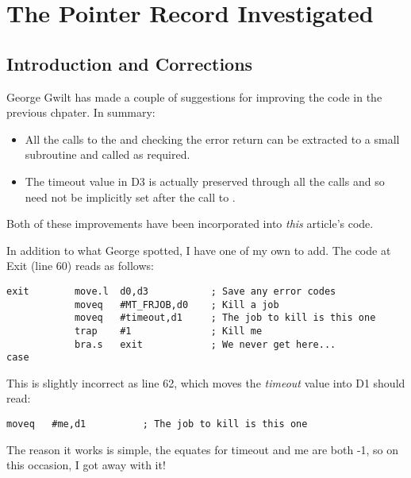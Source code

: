 \chapter{The Pointer Record Investigated}

\section{Introduction and Corrections}
\label{ch21-intro}%

George Gwilt has made a couple of suggestions for improving the code in the previous chpater. In summary:

\begin{itemize}[itemsep=0pt]

\item{}All the calls to the  and checking the error return can be extracted to a small subroutine and called as required.

\item{}The timeout value in D3 is actually preserved through all the  calls and so need not be implicitly set after the call to .

\end{itemize}

Both of these improvements have been incorporated into \emph{this} article's code. 

In addition to what George spotted, I have one of my own to add. The code at Exit (line 60) reads as follows:

\begin{lstlisting}[firstnumber=60,caption={Simple PE Program - Part 10 Original}]
exit        move.l  d0,d3           ; Save any error codes
            moveq   #MT_FRJOB,d0    ; Kill a job
            moveq   #timeout,d1     ; The job to kill is this one
            trap    #1              ; Kill me
            bra.s   exit            ; We never get here...
case
\end{lstlisting}

This is slightly incorrect as line 62, which moves the \emph{timeout} value into D1 should read:

\begin{lstlisting}[firstnumber=62,caption={Correction to line 62}]
            moveq   #me,d1          ; The job to kill is this one
\end{lstlisting}

The reason it works is simple, the equates for timeout and me are both -{}1, so on this occasion, I got away with it!

